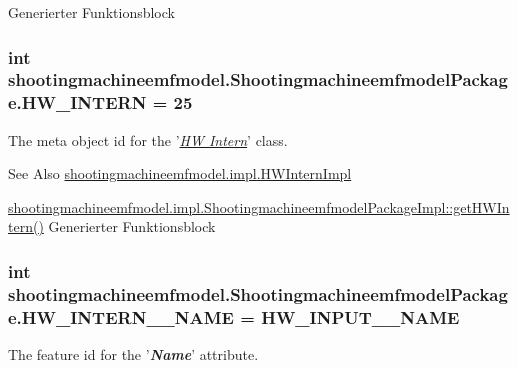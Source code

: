 Generierter Funktionsblock  \hypertarget{interfaceshootingmachineemfmodel_1_1_shootingmachineemfmodel_package_a0ff0aa7656387125821862056ec11ca9}{
\subsubsection[{H\-W\-\_\-\-I\-N\-T\-E\-R\-N}]{\setlength{\rightskip}{0pt plus 5cm}int shootingmachineemfmodel.\-Shootingmachineemfmodel\-Package.\-H\-W\-\_\-\-I\-N\-T\-E\-R\-N = 25}}\label{interfaceshootingmachineemfmodel_1_1_shootingmachineemfmodel_package_a0ff0aa7656387125821862056ec11ca9}
The meta object id for the '\hyperlink{classshootingmachineemfmodel_1_1impl_1_1_h_w_intern_impl}{{\itshape H\-W Intern}}' class.

\begin{DoxySeeAlso}{See Also}
\hyperlink{classshootingmachineemfmodel_1_1impl_1_1_h_w_intern_impl}{shootingmachineemfmodel.\-impl.\-H\-W\-Intern\-Impl} 

\hyperlink{classshootingmachineemfmodel_1_1impl_1_1_shootingmachineemfmodel_package_impl_a4d79c0f3a00def45b86046e8908636e7}{shootingmachineemfmodel.\-impl.\-Shootingmachineemfmodel\-Package\-Impl\-::get\-H\-W\-Intern()} Generierter Funktionsblock 
\end{DoxySeeAlso}
\hypertarget{interfaceshootingmachineemfmodel_1_1_shootingmachineemfmodel_package_a9b9bd65de59c357ad73e62c76be9b4dc}{
\subsubsection[{H\-W\-\_\-\-I\-N\-T\-E\-R\-N\-\_\-\-\_\-\-N\-A\-M\-E}]{\setlength{\rightskip}{0pt plus 5cm}int shootingmachineemfmodel.\-Shootingmachineemfmodel\-Package.\-H\-W\-\_\-\-I\-N\-T\-E\-R\-N\-\_\-\-\_\-\-N\-A\-M\-E = {\bf H\-W\-\_\-\-I\-N\-P\-U\-T\-\_\-\-\_\-\-N\-A\-M\-E}}}\label{interfaceshootingmachineemfmodel_1_1_shootingmachineemfmodel_package_a9b9bd65de59c357ad73e62c76be9b4dc}
The feature id for the '{\itshape {\bfseries Name}}' attribute.

